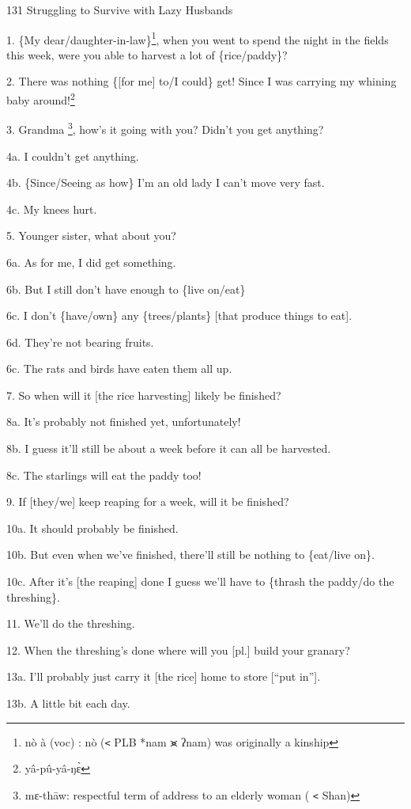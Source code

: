 
131 Struggling to Survive with Lazy Husbands

1. \{My dear/daughter-in-law\}\footnote{nò à (voc) : nò (\texttt{<} PLB *nam ⪤ ʔnam) was originally a kinship}, when you went to spend the night in the fields
this week, were you able to harvest a lot of \{rice/paddy\}?

2. There was nothing \{[for me] to/I could\} get! Since I was carrying my whining
baby around!\footnote{yâ-pû-yâ-ŋɛ̀}

3. Grandma \footnote{mɛ-thāw: respectful term of address to an elderly woman ( \texttt{<} Shan)}, how's it going with you? Didn't you get anything?

4a. I couldn't get anything.

4b. \{Since/Seeing as how\} I'm an old lady I can't move very fast.

4c. My knees hurt.

5. Younger sister, what about you?

6a. As for me, I did get something.

6b. But I still don't have enough to \{live on/eat\}

6c. I don't \{have/own\} any \{trees/plants\} [that produce things to eat].

6d. They're not bearing fruits.

6c. The rats and birds have eaten them all up.

7. So when will it [the rice harvesting] likely be finished?

8a. It's probably not finished yet, unfortunately!

8b. I guess it'll still be about a week before it can all be harvested.

8c. The starlings will eat the paddy too!

9. If [they/we] keep reaping for a week, will it be finished?

10a. It should probably be finished.

10b. But even when we've finished, there'll still be nothing to \{eat/live on\}.

10c. After it's [the reaping] done I guess we'll have to \{thrash the paddy/do
the threshing\}.

11. We'll do the threshing.

12. When the threshing's done where will you [pl.] build your granary?

13a. I'll probably just carry it [the rice] home to store [``put in''].

13b. A little bit each day.

